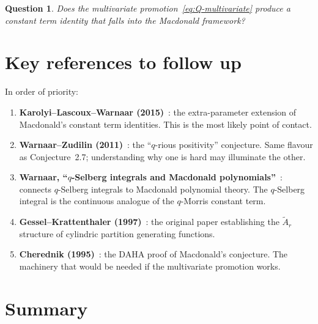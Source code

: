 \documentclass[11pt]{article}
\newtheorem{question}[theorem]{Question}
\begin{document}
\begin{question}
Does the multivariate promotion~\eqref{eq:Q-multivariate}
produce a constant term identity that falls into the
Macdonald framework?
\end{question}

\section{Key references to follow up}
\label{sec:refs}

In order of priority:

\begin{enumerate}
  \item \textbf{Karolyi--Lascoux--Warnaar (2015)}~\cite{klw-2015}:
    the extra-parameter extension of Macdonald's constant term
    identities. This is the most likely point of contact.
  \item \textbf{Warnaar--Zudilin (2011)}~\cite{warnaar-zudilin-2011}:
    the ``$q$-rious positivity'' conjecture. Same flavour as
    Conjecture~2.7; understanding why one is hard may illuminate
    the other.
  \item \textbf{Warnaar, ``$q$-Selberg integrals and Macdonald
    polynomials''}~\cite{warnaar-qselberg}: connects $q$-Selberg
    integrals to Macdonald polynomial theory. The $q$-Selberg
    integral is the continuous analogue of the $q$-Morris
    constant term.
  \item \textbf{Gessel--Krattenthaler (1997)}~\cite{gessel-krattenthaler-1997}:
    the original paper establishing the $\widetilde{A}_r$
    structure of cylindric partition generating functions.
  \item \textbf{Cherednik (1995)}~\cite{cherednik-1995}:
    the DAHA proof of Macdonald's conjecture. The machinery
    that would be needed if the multivariate promotion works.
\end{enumerate}

\section{Summary}
\label{sec:summary}
\end{document}
